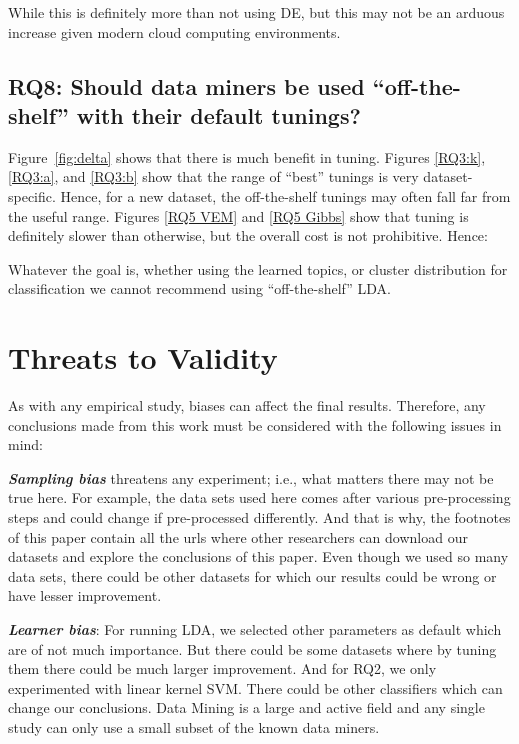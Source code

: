 \documentclass[twocolumn,5p,sort&compress]{elsarticle}
\theoremstyle{break}
\begin{document}
  While this is definitely more than not using DE, but this may not be an arduous increase
  given modern cloud computing environments.
  

\subsection{\textbf{RQ8: Should data miners be used ``off-the-shelf'' with their default tunings?}}

  Figure~\ref{fig:delta} shows that there is much benefit in tuning.
  Figures \ref{RQ3:k}, \ref{RQ3:a}, and \ref{RQ3:b} show that
  the range of ``best'' tunings is very dataset-specific. Hence, for a new dataset,
  the off-the-shelf tunings
  may often fall far from the useful range.
  Figures \ref{RQ5 VEM} and \ref{RQ5 Gibbs} show that tuning is definitely
  slower than otherwise, but the overall cost is not prohibitive.
  Hence:
  \begin{lesson}
    Whatever the goal is, whether using the learned topics, or cluster distribution for classification
    we cannot recommend using ``off-the-shelf'' LDA.
  \end{lesson}


\section{Threats to Validity}
\label{sect:validity}

As with any empirical study, biases can affect the final
results. Therefore, any conclusions made from this work must be considered with the following issues in mind:

\textbf{\textit{Sampling bias}} threatens any experiment; i.e., what matters there may not be true here. For example,
the data sets used here comes after various pre-processing steps and could change if pre-processed differently. And that is why, the footnotes of this paper contain all the urls where other researchers can download
our datasets and explore the conclusions of this paper. Even though we used so many data sets, there could be other datasets for which our results could be wrong or have lesser improvement.

\textbf{\textit{Learner bias}}: For running LDA, we selected other parameters as default which are of not much importance. But there could be some datasets where by tuning them there could be much larger improvement. And for RQ2, we only experimented with linear kernel SVM. There could be other classifiers which can change our conclusions. Data Mining is a large and active field and any single study can only use a small subset of the known data miners.
\end{document}
